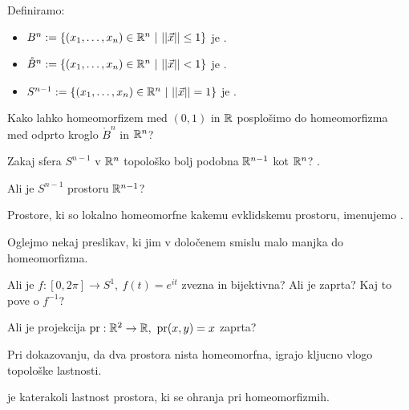\begin{definicija} Definiramo:
    \begin{itemize}
        \item $B^n := \left\{(x_1, \ldots, x_n) \in \mathbb{R}^n \ | \ ||\vec{x}|| \leq 1\right\}$ je .
        \item $\mathring{B}^n := \left\{(x_1, \ldots, x_n) \in \mathbb{R}^n \ | \ ||\vec{x}|| < 1\right\}$ je .
        \item $S^{n-1} := \left\{(x_1, \ldots, x_n) \in \mathbb{R}^n \ | \ ||\vec{x}|| = 1\right\}$ je .
    \end{itemize}
\end{definicija}

\begin{primer}
    Kako lahko homeomorfizem med $(0, 1)$ in $\mathbb{R}$ posplošimo do homeomorfizma med odprto kroglo $\mathring{B}^n$ in $\mathbb{R}^n$?
\end{primer}

\begin{primer}
    Zakaj sfera $S^{n-1}$ v $\mathbb{R}^n$ topološko bolj podobna $\mathbb{R}^{n-1}$ kot $\mathbb{R}^n$? .

    Ali je $S^{n-1}$  prostoru $\mathbb{R}^{n-1}$?
\end{primer}

\begin{definicija}
    Prostore, ki so lokalno homeomorfne kakemu evklidskemu prostoru, imenujemo .
\end{definicija}

Oglejmo nekaj preslikav, ki jim v določenem smislu malo manjka do homeomorfizma.

\begin{primer}
    Ali je $f: [0, 2 \pi] \to S^1, \ f(t) = e^{it}$ zvezna in bijektivna? Ali je zaprta? Kaj to pove o $f^{-1}$?
\end{primer}

\begin{primer}
    Ali je projekcija $\pr: \R^2 \to \R, \ \pr(x,y) = x$ zaprta?
\end{primer}

Pri dokazovanju, da dva prostora nista homeomorfna, igrajo kljucno vlogo topološke lastnosti.

\begin{definicija}
     je katerakoli lastnost prostora, ki se ohranja pri homeomorfizmih.
\end{definicija}

